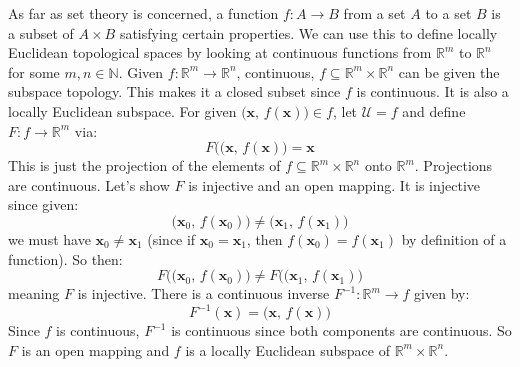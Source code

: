 \documentclass{article}
\theoremstyle{plain}
\theoremstyle{normal}
\newenvironment{example}{%
    \pushQED{\qed}\renewcommand{\qedsymbol}{$\blacksquare$}\examplex%
}{%
    \popQED\endexamplex%
}
\begin{document}
        \begin{example}
            As far as set theory is concerned, a function
            $f:A\rightarrow{B}$ from a set $A$ to a set $B$ is a subset of
            $A\times{B}$ satisfying certain properties. We can use this to
            define locally Euclidean topological spaces by looking at
            continuous functions from $\mathbb{R}^{m}$ to $\mathbb{R}^{n}$ for
            some $m,n\in\mathbb{N}$. Given
            $f:\mathbb{R}^{m}\rightarrow\mathbb{R}^{n}$, continuous,
            $f\subseteq\mathbb{R}^{m}\times\mathbb{R}^{n}$ can be given the
            subspace topology. This makes it a closed subset since $f$ is
            continuous. It is also a locally Euclidean subspace. For given
            $\big(\mathbf{x},\,f(\mathbf{x})\big)\in{f}$, let
            $\mathcal{U}=f$ and define $F:f\rightarrow\mathbb{R}^{m}$ via:
            \begin{equation}
                F\big((\mathbf{x},\,f(\mathbf{x})\big)=\mathbf{x}
            \end{equation}
            This is just the projection of the elements of
            $f\subseteq\mathbb{R}^{m}\times\mathbb{R}^{n}$ onto
            $\mathbb{R}^{m}$. Projections are continuous. Let's show
            $F$ is injective and an open mapping. It is injective since given:
            \begin{equation}
                \big(\mathbf{x}_{0},\,f(\mathbf{x}_{0})\big)
                \ne\big(\mathbf{x}_{1},\,f(\mathbf{x}_{1})\big)
            \end{equation}
            we must have $\mathbf{x}_{0}\ne\mathbf{x}_{1}$ (since if
            $\mathbf{x}_{0}=\mathbf{x}_{1}$, then
            $f(\mathbf{x}_{0})=f(\mathbf{x}_{1})$ by definition of a function).
            So then:
            \begin{equation}
                F\big((\mathbf{x}_{0},\,f(\mathbf{x}_{0})\big)
                \ne{F}\big((\mathbf{x}_{1},\,f(\mathbf{x}_{1})\big)
            \end{equation}
            meaning $F$ is injective. There is a continuous inverse
            $F^{-1}:\mathbb{R}^{m}\rightarrow{f}$ given by:
            \begin{equation}
                F^{-1}(\mathbf{x})
                =\big(\mathbf{x},\,f(\mathbf{x})\big)
            \end{equation}
            Since $f$ is continuous, $F^{-1}$ is continuous since both
            components are continuous. So $F$ is an open mapping and $f$
            is a locally Euclidean subspace of
            $\mathbb{R}^{m}\times\mathbb{R}^{n}$.
        \end{example}
\end{document}
